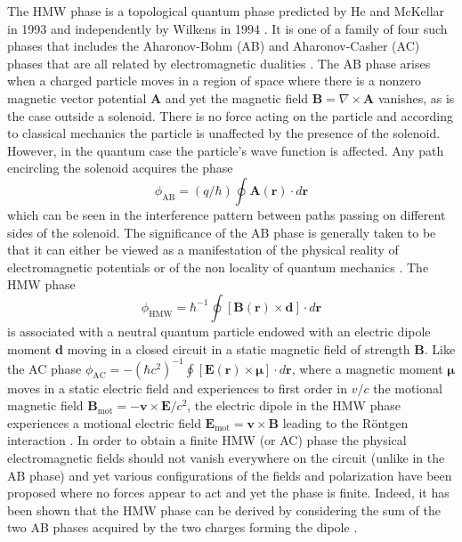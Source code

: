 \documentclass[twocolumn,english,pra,aps,superscriptaddress,floatfix]{revtex4-1}
\begin{document}
The HMW phase is a topological quantum phase predicted by He and McKellar in 1993 \cite{mckellar93} and independently by Wilkens in 1994 \cite{wilkens94}. It is one of a family of four such phases that includes the Aharonov-Bohm (AB) \cite{aharanov59} and Aharonov-Casher (AC) \cite{aharanov84} phases that are all related by electromagnetic dualities  \cite{dowling99}. The AB phase arises when a charged particle moves in a region of space where there is a nonzero magnetic vector potential $\mathbf{A}$ and yet the magnetic field $\mathbf{B}= \nabla \times \mathbf{A}$ vanishes, as is the case outside a solenoid. There is no force acting on the particle and according to classical mechanics the particle is unaffected by the presence of the solenoid. However, in the quantum case the particle's wave function is affected. Any path encircling the solenoid acquires the phase 
\begin{equation}
\phi_{\mathrm{AB}}=(q/ \hbar) \oint \mathbf{A}(\mathbf{r}) \cdot d \mathbf r
\label{eq:phiAB}
\end{equation}
 which can be seen in the interference pattern between paths passing on different sides of the solenoid. The significance of the AB phase is generally taken to be that it can either be viewed as a manifestation of the physical reality of electromagnetic potentials or of the non locality of quantum mechanics \cite{vaidmann}.  The HMW phase \cite{mckellar93,wilkens94}
 \begin{equation}
 \phi_{\mathrm{HMW}} = \hbar^{-1} \oint [\mathbf{B}(\mathbf{r}) \times \mathbf {d}] \cdot d \mathbf r 
 \label{eq:phiHMW}
 \end{equation}
  is associated with a neutral quantum particle endowed with an electric dipole moment $\mathbf{d}$ moving in a closed circuit in a static magnetic field of strength $\mathbf{B}$. Like the AC phase $\phi_{\mathrm{AC}} = -(\hbar c^2)^{-1} \oint [\mathbf{E}(\mathbf{r}) \times \boldsymbol{\mu}] \cdot d \mathbf r $, where a magnetic moment $\boldsymbol{\mu}$ moves in a static electric field and experiences to first order in $v/c$ the motional magnetic field $\mathbf{B}_{\mathrm{mot}} = - \mathbf{v} \times \mathbf{E} /c^2$, the electric dipole in the HMW phase  experiences a motional electric field $\mathbf{E}_{\mathrm{mot}} = \mathbf{v} \times \mathbf{B}$ leading to the R\"{o}ntgen interaction \cite{wilkens94}. In order to obtain a finite HMW (or AC) phase the physical electromagnetic fields should not vanish everywhere on the circuit (unlike in the AB phase) and yet various configurations of the fields and polarization have been proposed \cite{mckellar93,wilkens94,dowling99,wei95} where no forces appear to act and yet the phase is finite.  Indeed, it has been shown that the HMW phase can be derived by considering the sum of the two AB phases acquired by the two charges forming the dipole \cite{wei95}. 
   
\end{document}
